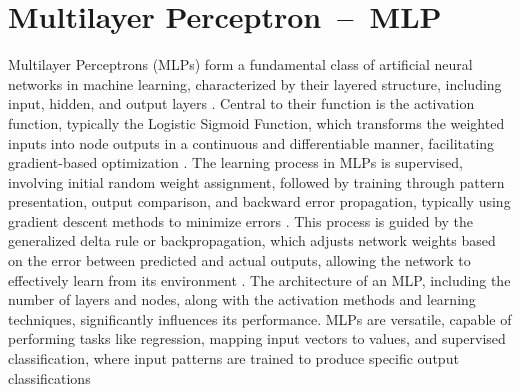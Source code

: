 \section{Multilayer Perceptron~--~MLP}\label{MLP}

Multilayer Perceptrons (MLPs) form a fundamental class of artificial neural networks in machine learning, characterized by their layered structure, including input, hidden, and output layers \citep{noriega2005multilayer, MurtaghMLP}.  Central to their function is the activation function, typically the Logistic Sigmoid Function, which transforms the weighted inputs into node outputs in a continuous and differentiable manner, facilitating gradient-based optimization \citep{MurtaghMLP, noriega2005multilayer}. The learning process in MLPs is supervised, involving initial random weight assignment, followed by training through pattern presentation, output comparison, and backward error propagation, typically using gradient descent methods to minimize errors \citep{noriega2005multilayer}. This process is guided by the generalized delta rule or backpropagation, which adjusts network weights based on the error between predicted and actual outputs, allowing the network to effectively learn from its environment \citep{MurtaghMLP}. The architecture of an MLP, including the number of layers and nodes, along with the activation methods and learning techniques, significantly influences its performance. MLPs are versatile, capable of performing tasks like regression, mapping input vectors to values, and supervised classification, where input patterns are trained to produce specific output classifications \citep{MurtaghMLP}

